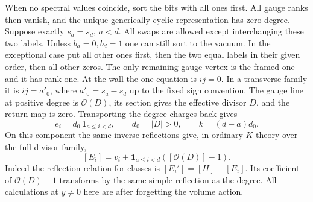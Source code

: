When no spectral values coincide, sort the bits with all ones first. All gauge ranks then vanish, and the unique generically cyclic representation has zero degree. Suppose exactly $s_a=s_d$, $a<d$. All swaps are allowed except interchanging these two labels. Unless $b_a=0,b_d=1$ one can still sort to the vacuum. In the exceptional case put all other ones first, then the two equal labels in their given order, then all other zeros. The only remaining gauge vertex is the framed one and it has rank one. At the wall the one equation is $ij=0$. In a transverse family it is $ij=a'_0$, where $a'_0=s_a-s_d$ up to the fixed sign convention. The gauge line at positive degree is $\mathcal O(D)$, its section gives the effective divisor $D$, and the return map is zero. Transporting the degree charges back gives
\[
e_i=d_0\,\mathbf1_{a\le i<d},\qquad d_0=|D|>0,\qquad k=(d-a)d_0 .
\]
On this component the same inverse reflections give, in ordinary $K$-theory over the full divisor family,
\[
[E_i]=v_i+\mathbf1_{a\le i<d}([\mathcal O(D)]-1).
\]
Indeed the reflection relation for classes is $[E_i']=[H]-[E_i]$. Its coefficient of $\mathcal O(D)-1$ transforms by the same simple reflection as the degree. All calculations at $y\ne0$ here are after forgetting the volume action.


